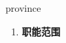 
\begin{frame}
{\huge province}
\begin{center}
\begin{enumerate}\Large
  \item \textbf{职能范围}
\end{enumerate}
\end{center}
\end{frame}
